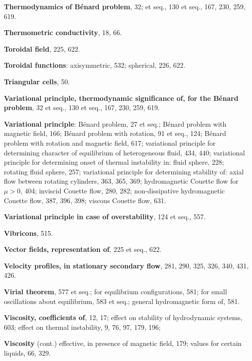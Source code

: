 \begin{small}
\medskip\noindent
\textbf{Thermodynamics of B\'enard problem}, 32;
  et seq., 130 et seq., 167, 230, 259,
    619.

\medskip\noindent
\textbf{Thermometric conductivity}, 18, 66.

\medskip\noindent
\textbf{Toroidal field}, 225, 622.

\medskip\noindent
\textbf{Toroidal functions}:
  axisymmetric, 532;
  spherical, 226, 622.

\medskip\noindent
\textbf{Triangular cells}, 50.

\bigskip\noindent
\textbf{Variational principle, thermodynamic significance of, for the B\'enard problem},
  32 et seq., 130 et seq., 167, 230, 259,
    619.

\medskip\noindent
\textbf{Variational principle}:
  B\'enard problem, 27 et seq.;
  B\'enard problem with magnetic field,
    166;
  B\'enard problem with rotation, 91 et
    seq., 124;
  B\'enard problem with rotation and magnetic field, 617;
  variational principle for determining character of equilibrium of heterogeneous
    fluid, 434, 440;
  variational principle for determining
    onset of thermal instability in:
    fluid sphere, 228;
    rotating fluid sphere, 257;
  variational principle for determining stability of:
    axial flow between rotating cylinders,
      363, 365, 369;
  hydromagnetic Couette flow for $\mu > 0$,
    404;
  inviscid Couette flow, 280, 282;
  non-dissipative hydromagnetic Couette
    flow, 387, 396, 398;
  viscous Couette flow, 631.

\medskip\noindent
\textbf{Variational principle in case of overstability}, 124 et seq., 557.

\medskip\noindent
\textbf{Vibricons}, 515.

\medskip\noindent
\textbf{Vector fields, representation of}, 225 et
  seq., 622.

\medskip\noindent
\textbf{Velocity profiles, in stationary secondary
  flow}, 281, 290, 325, 326, 340, 431, 426.

\medskip\noindent
\textbf{Virial theorem}, 577 et seq.;
  for equilibrium configurations, 581;
  for small oscillations about equilibrium,
    583 et seq.;
  general hydromagnetic form of, 581.

\medskip\noindent
\textbf{Viscosity, coefficients of}, 12, 17;
  effect on stability of hydrodynamic
    systems, 603;
  effect on thermal instability, 9, 76, 97,
    179, 196;

\medskip\noindent
\textbf{Viscosity} (cont.)
  effective, in presence of magnetic field,
    179;
  values for certain liquids, 66, 329.


\end{small}
